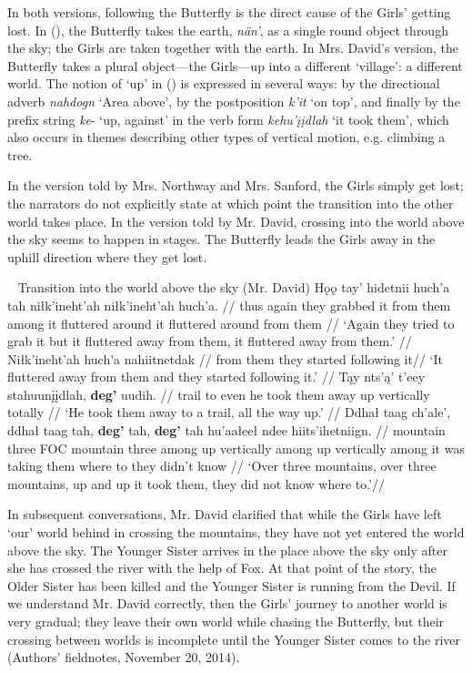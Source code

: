In both versions, following the Butterfly is the direct cause of the Girls' getting lost. In (), the Butterfly takes the earth, {\em nän'}, as a single round object through the sky; the Girls are taken together with the earth. In Mrs. David's version, the Butterfly takes a plural object—the Girls—up into a different `village': a different world. The notion of `up' in () is expressed in several ways: by the directional adverb {\em nahdogn} `Area above', by the postposition {\em k'it} `on top', and finally by the prefix string {\em ke}- `up, against' in the verb form {\em kehu'įįdlah} `it took them', which also occurs in themes describing other types of vertical motion, e.g. climbing a tree.

In the version told by Mrs. Northway and Mrs. Sanford, the Girls simply get lost; the narrators do not explicitly state at which point the transition into the other world takes place. In the version told by Mr. David, crossing into the world above the sky seems to happen in stages. The Butterfly leads the Girls away in the uphill direction where they get lost.

\pex~ Transition into the world above the sky (Mr. David)
\a
\begingl
\gla Hǫǫ tay' hidetnii huch'a tah niłk'ineht'ah niłk'ineht'ah huch'a.  //
\glb thus again {they grabbed it} {from them} among {it fluttered around} {it fluttered around} {from them} //
\glft `Again they tried to grab it but it fluttered away from them, it fluttered away from them.' //
\endgl
\a
\begingl
\gla Niłk'ineht'ah huch'a nahiitnetdak  //
 {from them} {they started following it}//
\glft `It fluttered away from them and they started following it.' //
\endgl
\a
\begingl
\gla Tąy nts'ą' t'eey stahuunįįdlah, \textbf{deg'} uudih. //
\glb trail to even {he took them away} {up vertically} {totally} //
\glft `He took them away to a trail, all the way up.' //
\endgl
\a
\begingl
\gla Ddhał taag ch'ale',  ddhał taag tah, \textbf{deg'} tah, \textbf{deg'} tah hu'aałeeł ndee hiits'ihetniign.  //
\glb mountain three FOC mountain three among {up vertically} among {up vertically} among {it was taking them} {where to} {they didn't know}  //
\glft `Over three mountains, over three mountains, up and up it took them, they did not know where to.'//
\endgl
\xe

In subsequent conversations, Mr. David clarified that while the Girls have left `our' world behind in crossing the mountains, they have not yet entered the world above the sky. The Younger Sister arrives in the place above the sky only after she has crossed the river with the help of Fox. At that point of the story, the Older Sister has been killed and the Younger Sister is running from the Devil. If we understand Mr. David correctly, then the Girls' journey to another world is very gradual; they leave their own world while chasing the Butterfly, but their crossing between worlds is incomplete until the Younger Sister comes to the river (Authors' fieldnotes, November 20, 2014).

